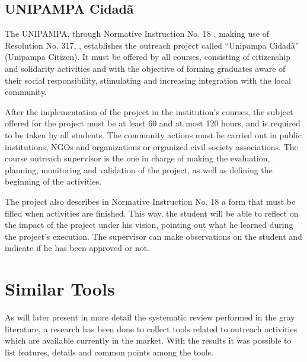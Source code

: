 
\subsection{UNIPAMPA Cidadã}\label{sec:bac-cidada}

The \acl{UNIPAMPA}, through Normative Instruction No. 18 \cite{unipampacidada}, making use of Resolution No. 317, \cite{res317}, establishes the outreach project called ``Unipampa Cidadã'' (Unipampa Citizen). It must be offered by all courses, consisting of citizenship and solidarity activities and with the objective of forming graduates aware of their social responsibility, stimulating and increasing integration with the local community.

After the implementation of the project in the institution's courses, the subject offered for the project must be at least 60 and at most 120 hours, and is required to be taken by all students. The community actions must be carried out in public institutions, \aclp{NGO} and organizations or organized civil society associations. The course outreach supervisor is the one in charge of making the evaluation, planning, monitoring and validation of the project, as well as defining the beginning of the activities.

The project also describes in Normative Instruction No. 18 a form that must be filled when activities are finished. This way, the student will be able to reflect on the impact of the project under his vision, pointing out what he learned during the project's execution. The supervisor can make observations on the student and indicate if he has been approved or not.

\section{Similar Tools}\label{sec:bac-tools}

As  will later present in more detail the systematic review performed in the gray literature, a research has been done to collect tools related to outreach activities which are available currently in the market. With the results it was possible to list features, details and common points among the tools.

